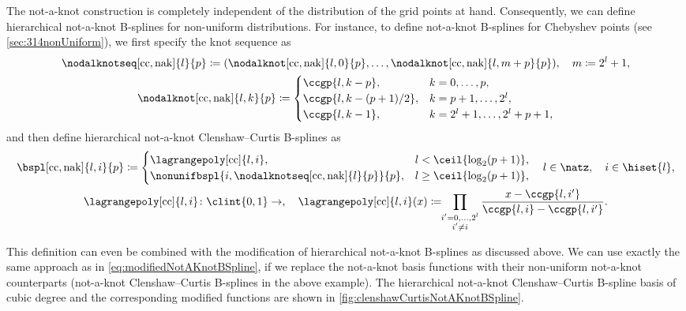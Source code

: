 The not-a-knot construction is completely independent of the
distribution of the grid points at hand.
Consequently, we can define hierarchical not-a-knot B-splines
for non-uniform distributions.
For instance, to define not-a-knot B-splines for
Chebyshev points (see \cref{sec:314nonUniform}),
we first specify the knot sequence as
\begin{subequations}
  \begin{gather}
    \nodalknotseq[\cc,\nak]{l}{p}
    \ceq (\nodalknot[\cc,\nak]{l,0}{p}, \dotsc,
    \nodalknot[\cc,\nak]{l,m+p}{p}),\quad
    m \ceq 2^l + 1,\\
    \nodalknot[\cc,\nak]{l,k}{p}
    \ceq
    \begin{cases}
      \ccgp{l,k-p},&
      k = 0, \dotsc, p,\\
      \ccgp{l,k-(p+1)/2},&
      k = p + 1, \dotsc, 2^l,\\
      \ccgp{l,k-1},&
      k = 2^l + 1, \dotsc, 2^l + p + 1,
    \end{cases}
  \end{gather}
\end{subequations}
and then define hierarchical not-a-knot Clenshaw--Curtis B-splines as
\begin{subequations}
  \begin{gather}
    \bspl[\cc,\nak]{l,i}{p}
    \ceq
    \begin{cases}
      \lagrangepoly[\cc]{l,i},&
      l < \ceil{\log_2(p+1)},\\
      \nonunifbspl{i,\nodalknotseq[\cc,\nak]{l}{p}}{p},&
      l \ge \ceil{\log_2(p+1)},
    \end{cases}\quad
    l \in \natz,\quad
    i \in \hiset{l},\\
    \lagrangepoly[\cc]{l,i}\colon \clint{0, 1} \to \real,\quad
    \lagrangepoly[\cc]{l,i}(x)
    \ceq \!\!\prod_{\substack{i'=0,\dotsc,2^l\\i'\not=i}}
    \frac{x - \ccgp{l,i'}}%
    {\ccgp{l,i} - \ccgp{l,i'}}.
  \end{gather}
\end{subequations}

This definition can even be combined with the modification
of hierarchical not-a-knot B-splines as discussed above.
We can use exactly the same approach as in
\eqref{eq:modifiedNotAKnotBSpline}, if we replace the
not-a-knot basis functions with their non-uniform not-a-knot counterparts
(not-a-knot Clenshaw--Curtis B-splines in the above example).
The hierarchical not-a-knot Clenshaw--Curtis B-spline basis of
cubic degree and the corresponding modified functions are shown in
\cref{fig:clenshawCurtisNotAKnotBSpline}.


